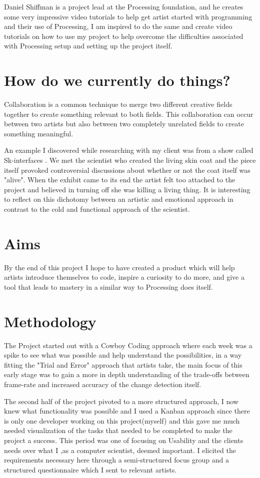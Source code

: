 \documentclass[a4paper]{report}
\begin{document}
Daniel Shiffman \cite{SHIFFMAN} is a project lead at the Processing foundation, and he creates some very impressive video tutorials to help get artist started with programming and their use of Processing, I am inspired to do the same and create video tutorials on how to use my project to help overcome the difficulties associated with Processing setup and setting up the project itself.

\section{How do we currently do things?}
Collaboration is a common technique to merge two different creative fields together to create something relevant to both fields. This collaboration can occur between two artists but also between two completely unrelated fields to create something meaningful. 

An example I discovered while researching with my client was from a show called Sk-interfaces \cite{SKIN}. We met the scientist who created the living skin coat and the piece itself provoked controversial discussions about whether or not the coat itself was "alive". When the exhibit came to its end the artist felt too attached to the project and believed in turning off she was killing a living thing. It is interesting to reflect on this dichotomy between an artistic and emotional approach in contrast to the cold and functional approach of the scientist.

\section{Aims}
By the end of this project I hope to have created a product which will help artists introduce themselves to code, inspire a curiosity to do more, and give a tool that leads to mastery in a similar way to Processing\cite{PROCESSING} does itself.

\section{Methodology}
The Project started out with a Cowboy Coding approach where each week was a spike to see what was possible and help understand the possibilities, in a way fitting the "Trial and Error" approach that artists take, the main focus of this early stage was to gain a more in depth understanding of the trade-offs between frame-rate and increased accuracy of the change detection itself.

The second half of the project pivoted to a more structured approach, I now knew what functionality was possible and I used a Kanban\cite{KANBAN} approach since there is only one developer working on this project(myself) and this gave me much needed visualization of the tasks that needed to be completed to make the project a success. This period was one of focusing on Usability and the clients needs over what I ,as a computer scientist, deemed important. I elicited the requirements necessary here through a semi-structured focus group and a structured questionnaire which I sent to relevant artists.
\end{document}
